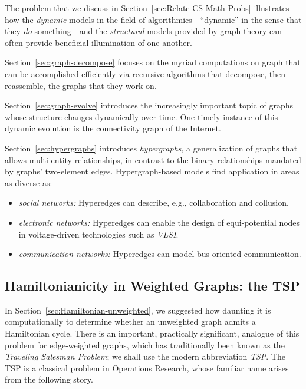 The problem that we discuss in Section~\ref{sec:Relate-CS-Math-Probs}
illustrates how the {\em dynamic} models in the field of
algorithmics---``dynamic'' in the sense that they {\em do}
something---and the {\em structural} models provided by graph theory
can often provide beneficial illumination of one another.

Section~\ref{sec:graph-decompose} 
 focuses on the myriad computations
on graph that can be accomplished efficiently via recursive algorithms
that decompose, then reassemble, the graphs that they work on.

Section~\ref{sec:graph-evolve} 
introduces the increasingly important topic of graphs whose structure
changes dynamically over time.  One timely instance of this dynamic
evolution is the connectivity graph of the Internet.

Section~\ref{sec:hypergraphs} 
 introduces {\it hypergraphs}, a generalization of
graphs that allows multi-entity relationships, in contrast to the
binary relationships mandated by graphs' two-element edges.
Hypergraph-based models find application in areas as diverse as:
\begin{itemize}
\item
{\it social networks:} Hyperedges can describe, e.g., collaboration
and collusion.
\item
{\it electronic networks:} Hyperedges can enable the design of
equi-potential nodes in voltage-driven technologies such as {\it
  VLSI}.
\item
{\it communication networks:} Hyperedges can model bus-oriented
communication.
\end{itemize}

\subsection{Hamiltonianicity in Weighted Graphs: the TSP}
\label{sec:TSP}

In Section~\ref{sec:Hamiltonian-unweighted}, we suggested how daunting
it is computationally to determine whether an unweighted graph admits
a Hamiltonian cycle.  There is an important, practically significant,
analogue of this problem for edge-weighted graphs, which has
traditionally been known as the {\it Traveling Salesman Problem}; we
shall use the modern abbreviation {\it TSP}.
The TSP is a classical problem in Operations Research, whose familiar
name arises from the following story.

